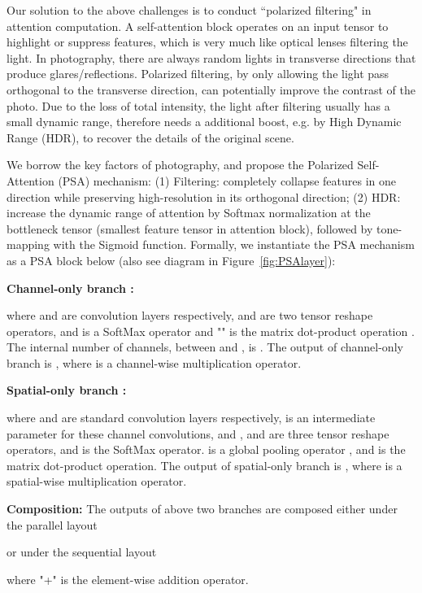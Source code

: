 \documentclass[10pt,twocolumn,letterpaper]{article}
\begin{document}
Our solution to the above challenges is to conduct ``polarized filtering" in attention computation. A self-attention block operates on an input tensor  to highlight or suppress features, which is very much like optical lenses filtering the light. In photography, there are always random lights in transverse directions that produce glares/reflections. Polarized filtering, by only allowing the light pass orthogonal to the transverse direction, can potentially improve the contrast of the photo. Due to the loss of total intensity, the light after filtering usually has a small dynamic range, therefore needs a additional boost, e.g. by High Dynamic Range (HDR), to recover the details of the original scene. 

We borrow the key factors of photography, and propose the Polarized Self-Attention (PSA) mechanism: (1) Filtering: completely collapse features in one direction while preserving high-resolution in its orthogonal direction;  (2) HDR: increase the dynamic range of attention by Softmax normalization at the bottleneck tensor (smallest feature tensor in attention block), followed by tone-mapping with the Sigmoid function. Formally, we instantiate the PSA mechanism as a PSA block below (also see diagram in Figure~\ref{fig:PSAlayer}):

\textbf{Channel-only branch :}  

where  and  are  convolution layers respectively,  and  are two tensor reshape operators, and  is a SoftMax operator and "" is the matrix dot-product operation . The internal number of channels, between  and , is . The output of channel-only branch is , where  is a channel-wise multiplication operator. 

 \textbf{Spatial-only branch :}  

where  and  are standard  convolution layers respectively,  is an intermediate parameter for these channel convolutions, and ,  and  are three tensor reshape operators, and  is the SoftMax operator.  is a global pooling operator , and  is the matrix dot-product operation. The output of spatial-only branch is , where  is a spatial-wise multiplication operator. 

\textbf{Composition:} The outputs of above two branches are composed either under the parallel layout

or under the sequential layout

where "+" is the element-wise addition operator.
\end{document}
